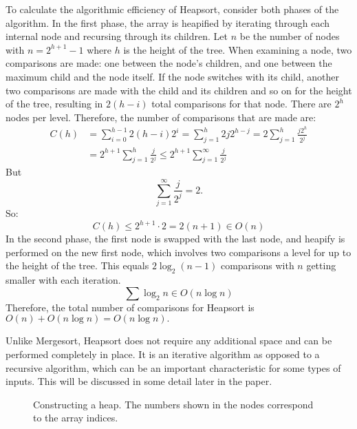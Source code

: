 \documentclass{article}
\begin{document}
To calculate the algorithmic efficiency of Heapsort, consider both phases of the algorithm.
In the first phase, the array is heapified by iterating through each internal node and recursing
through its children. Let $n$ be the number of nodes with $n = 2^{h+1} - 1$ where $h$ is the height 
of the tree. When examining a node, two comparisons are made: 
one between the node's children, and one between the maximum child and the node itself. If the 
node switches with its child, another two comparisons are made with the child and its children and so 
on for the height of the tree, resulting in $2(h-i)$ total comparisons for that node. There are $2^h$ 
nodes per level. Therefore, the number of comparisons that are made are:
\begin{align*}
	C(h) &= \sum_{i=0}^{h-1} 2(h-i) 2^i = \sum_{j=1}^{h}2j 2^{h-j} = 2 \sum_{j=1}^h \frac{j2^h}{2^j}\\
	&= 2^{h+1} \sum_{j=1}^h \frac{j}{2^j} \le 2^{h+1}\sum_{j=1}^{\infty} \frac{j}{2^j}
\end{align*}
But 
\[
	\sum_{j=1}^{\infty} \frac{j}{2^j} = 2.
\]
So:
\[
	C(h) \le 2^{h+1} \cdot 2 = 2(n + 1) \in O(n)
\] 
In the second phase, the first node is swapped with the last node, and heapify is performed on
the new first node, which involves two comparisons a level for up to the height of the tree. 
This equals $2 \log_2(n-1)$ comparisons with $n$ getting smaller with each iteration. 
\[
	\sum \log_2 n \in O(n \log n)
\]
Therefore, the total number of comparisons for Heapsort is $O(n) + O(n\log n) = O(n\log n).$

Unlike Mergesort, Heapsort does not require any additional space and can be performed
completely in place. It is an iterative algorithm as opposed to a recursive algorithm, which
can be an important characteristic for some types of inputs. This will be discussed in some 
detail later in the paper.

\begin{figure}[heap]
	\begin{center}
	\caption{Constructing a heap. The numbers shown in the nodes correspond to the array indices.}
	\label{heap}\end{center}
\end{figure}
\end{document}
